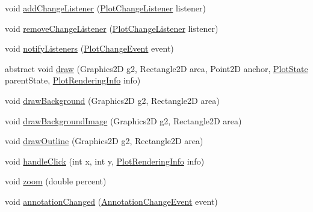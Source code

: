 \begin{DoxyCompactItemize}
\item 
void \mbox{\hyperlink{classorg_1_1jfree_1_1chart_1_1plot_1_1_plot_af45cb36f24e3ef3650fcbf387c29e7cc}{add\+Change\+Listener}} (\mbox{\hyperlink{interfaceorg_1_1jfree_1_1chart_1_1event_1_1_plot_change_listener}{Plot\+Change\+Listener}} listener)
\item 
void \mbox{\hyperlink{classorg_1_1jfree_1_1chart_1_1plot_1_1_plot_a22b9d9efffe33edd36a3b7999ee5e1fd}{remove\+Change\+Listener}} (\mbox{\hyperlink{interfaceorg_1_1jfree_1_1chart_1_1event_1_1_plot_change_listener}{Plot\+Change\+Listener}} listener)
\item 
void \mbox{\hyperlink{classorg_1_1jfree_1_1chart_1_1plot_1_1_plot_a2c2743526c7bcd6c548bfdef793a34f5}{notify\+Listeners}} (\mbox{\hyperlink{classorg_1_1jfree_1_1chart_1_1event_1_1_plot_change_event}{Plot\+Change\+Event}} event)
\item 
abstract void \mbox{\hyperlink{classorg_1_1jfree_1_1chart_1_1plot_1_1_plot_a2622697ee7fcb983a92860c93177089c}{draw}} (Graphics2D g2, Rectangle2D area, Point2D anchor, \mbox{\hyperlink{classorg_1_1jfree_1_1chart_1_1plot_1_1_plot_state}{Plot\+State}} parent\+State, \mbox{\hyperlink{classorg_1_1jfree_1_1chart_1_1plot_1_1_plot_rendering_info}{Plot\+Rendering\+Info}} info)
\item 
void \mbox{\hyperlink{classorg_1_1jfree_1_1chart_1_1plot_1_1_plot_a6b8f006db9e87e2e77502d727dfe74b7}{draw\+Background}} (Graphics2D g2, Rectangle2D area)
\item 
void \mbox{\hyperlink{classorg_1_1jfree_1_1chart_1_1plot_1_1_plot_abd594f5eb7327fb15f108dccffe8a7cd}{draw\+Background\+Image}} (Graphics2D g2, Rectangle2D area)
\item 
void \mbox{\hyperlink{classorg_1_1jfree_1_1chart_1_1plot_1_1_plot_aef03ab51bf529dd93127eb5df5e6d582}{draw\+Outline}} (Graphics2D g2, Rectangle2D area)
\item 
void \mbox{\hyperlink{classorg_1_1jfree_1_1chart_1_1plot_1_1_plot_aa4fb6801a1b5e5d874b6e2c0e9a9fb95}{handle\+Click}} (int x, int y, \mbox{\hyperlink{classorg_1_1jfree_1_1chart_1_1plot_1_1_plot_rendering_info}{Plot\+Rendering\+Info}} info)
\item 
void \mbox{\hyperlink{classorg_1_1jfree_1_1chart_1_1plot_1_1_plot_adc0b60cf431bbf906c22110b2377100b}{zoom}} (double percent)
\item 
void \mbox{\hyperlink{classorg_1_1jfree_1_1chart_1_1plot_1_1_plot_a924668be492b2c151c1de74b3cd73f58}{annotation\+Changed}} (\mbox{\hyperlink{classorg_1_1jfree_1_1chart_1_1event_1_1_annotation_change_event}{Annotation\+Change\+Event}} event)

\end{DoxyCompactItemize}
